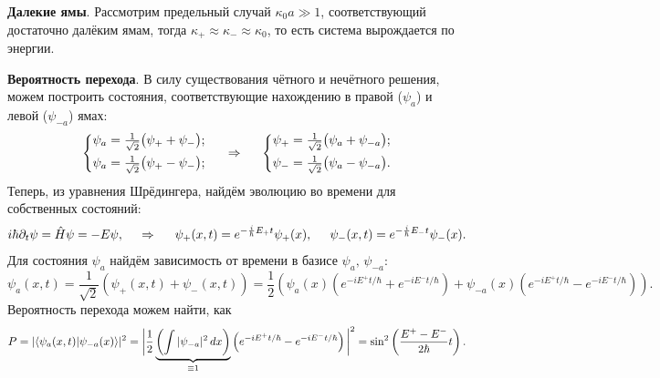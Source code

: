 \textbf{Далекие ямы}. Рассмотрим предельный случай $\kappa_0 a \gg 1$, соответствующий достаточно далёким ямам, тогда $\kappa_+ \approx \kappa_- \approx \kappa_0$, то есть система вырождается по энергии. 


\textbf{Вероятность перехода}. В силу существования чётного и нечётного решения, можем построить состояния, соответствующие нахождению в правой ($\psi_a$) и левой ($\psi_{-a}$) ямах:
\begin{equation*}
    \left\{\begin{aligned}
        \psi_a &= \tfrac{1}{\sqrt{2}} \big( \psi_+ + \psi_- \big); \\
        \psi_a &= \tfrac{1}{\sqrt{2}} \big( \psi_+ - \psi_- \big);
    \end{aligned}\right.
    \hspace{0.5cm} \Rightarrow \hspace{0.5cm}
    \left\{\begin{aligned}
        \psi_+ &= \tfrac{1}{\sqrt{2}} \big( \psi_a + \psi_{-a} \big);\\
        \psi_- &= \tfrac{1}{\sqrt{2}} \big( \psi_a - \psi_{-a} \big).\\
    \end{aligned}\right.
\end{equation*}
Теперь, из уравнения Шрёдингера, найдём эволюцию во времени для собственных состояний:
\begin{equation*}
    i \hbar \partial_t \psi = \hat{H} \psi = - E \psi,
    \hspace{0.5cm} \Rightarrow \hspace{0.5cm}
    \psi_+ (x, t) = e^{- \frac{i}{\hbar} E_+ t} \psi_+(x),
    \hspace{5 mm} 
    \psi_- (x, t) = e^{- \frac{i}{\hbar} E_- t} \psi_-(x).
\end{equation*}
Для состояния $\psi_a$ найдём зависимость от времени в базисе $\psi_a,\, \psi_{-a}$:
\begin{equation*}
    \psi_a (x, t) = 
    \frac{1}{\sqrt{2}} (\psi_+(x, t) + \psi_- (x, t)) = 
    \frac{1}{2} \left(
        \psi_a(x) \left(
            e^{-i E^+ t / \hbar} + e^{- i E^- t / \hbar}
        \right) + \psi_{-a}(x) \left(
            e^{-i E^+ t / \hbar} - e^{-i E^- t / \hbar}
        \right)
    \right).
\end{equation*}
Вероятность перехода можем найти, как
\begin{equation*}   
    P = | \bk{\psi_{a}(x, t)}{\psi_{-a}(x)}|^2 = \bigg|
        \frac{1}{2} \underbrace{\left(
            \int |\psi_{-a}|^2 \d x
        \right)}_{\equiv 1} \left(
            e^{- i E^+ t / \hbar} - e^{-i E^- t / \hbar}
        \right)
    \bigg|^2 = \sin^2 \left(
        \frac{E^+ - E^-}{2 \hbar} t
    \right).
\end{equation*}
